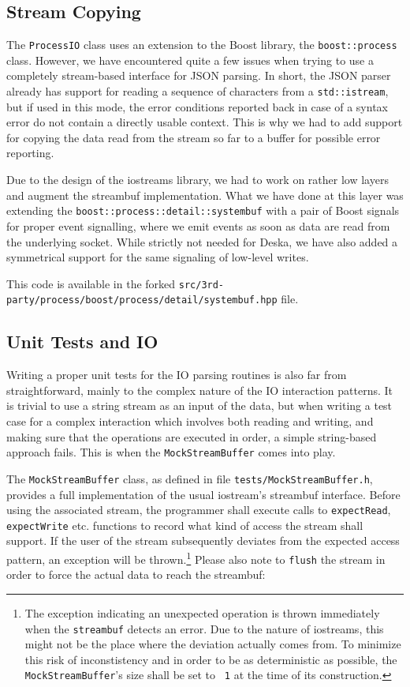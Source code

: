 \documentclass[deska]{subfiles}
\begin{document}
\subsection{Stream Copying}

The {\tt ProcessIO} class uses an extension to the Boost library, the {\tt boost::process} class.  However, we have
encountered quite a few issues when trying to use a completely stream-based interface for JSON parsing.  In short, the
JSON parser already has support for reading a sequence of characters from a {\tt std::istream}, but if used in this
mode, the error conditions reported back in case of a syntax error do not contain a directly usable context.  This is
why we had to add support for copying the data read from the stream so far to a buffer for possible error reporting.

Due to the design of the iostreams library, we had to work on rather low layers and augment the streambuf
implementation.  What we have done at this layer was extending the {\tt boost::process::detail::systembuf} with a pair
of Boost signals for proper event signalling, where we emit events as soon as data are read from the underlying socket.
While strictly not needed for Deska, we have also added a symmetrical support for the same signaling of low-level
writes.

This code is available in the forked {\tt src/3rd-party/process/boost/process/detail/systembuf.hpp} file.

\subsection{Unit Tests and IO}

Writing a proper unit tests for the IO parsing routines is also far from straightforward, mainly to the complex nature
of the IO interaction patterns.  It is trivial to use a string stream as an input of the data, but when writing a test
case for a complex interaction which involves both reading and writing, and making sure that the operations are executed
in order, a simple string-based approach fails.  This is when the {\tt MockStreamBuffer} comes into play.

The {\tt MockStreamBuffer} class, as defined in file {\tt tests/MockStreamBuffer.h}, provides a full implementation of
the usual iostream's streambuf interface.  Before using the associated stream, the programmer shall execute calls to
{\tt expectRead}, {\tt expectWrite} etc. functions to record what kind of access the stream shall support.  If the user
of the stream subsequently deviates from the expected access pattern, an exception will be thrown.\footnote{The exception
indicating an unexpected operation is thrown immediately when the {\tt streambuf} detects an error.  Due to the nature
of iostreams, this might not be the place where the deviation actually comes from.  To minimize this risk of
inconstistency and in order to be as deterministic as possible, the {\tt MockStreamBuffer}'s size shall be set to {\tt
1} at the time of its construction.}  Please also note to {\tt flush} the stream in order to force the actual data to
reach the streambuf:
\end{document}
